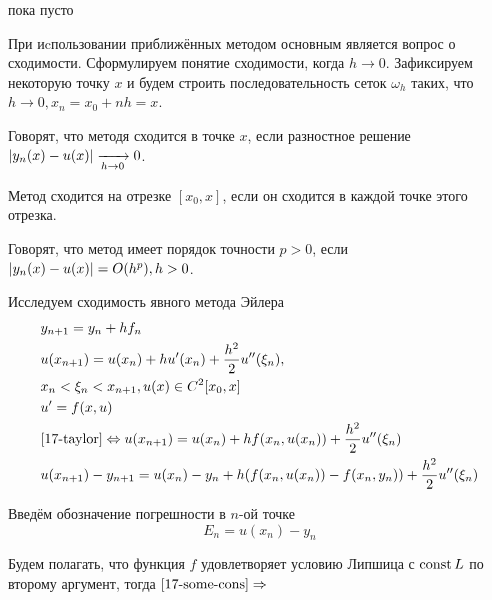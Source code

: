  \begin{col-answer-preambule}
	\begin{plan}
    \item пока пусто
	\end{plan}
\end{col-answer-preambule}


При иcпользовании приближённых методом основным является вопрос о сходимости.
Сформулируем понятие сходимости, когда $h \to 0$. Зафиксируем некоторую точку
$x$ и будем строить последовательность сеток $\omega_h$ таких, что $h \to 0,
x_n = x_0 + nh = x$.

\begin{definition}
  Говорят, что методя сходится в точке $x$, если разностное решение
  $\left\lvert y_n(x) - u(x) \right\rvert \xrightarrow[h \to 0]{} 0$.
\end{definition}

\begin{definition}
  Метод сходится на отрезке $[x_0, x]$, если он сходится в каждой точке этого
  отрезка.
\end{definition}

\begin{definition}
  Говорят, что метод имеет порядок точности $p > 0$, если $\left\lvert y_n(x) - u(x) \right\rvert
  = O(h^p), h > 0$.
\end{definition}

Исследуем сходимость явного метода Эйлера
\begin{align}
  &y_{n + 1} = y_n + hf_n\\
  \label{17-taylor}
  &u(x_{n + 1}) = u(x_n) + hu'(x_n) + \dfrac{h^2}{2}u''(\xi_n),\\
  \nonumber
  &x_n < \xi_n < x_{n + 1}, u(x) \in C^2[x_0, x]\\
  &u' = f(x, u)\\
  &\eqref{17-taylor} \Leftrightarrow u(x_{n + 1}) = u(x_n) + hf(x_n, u(x_n)) +
  \dfrac{h^2}{2}u''(\xi_n)\\
  \label{17-some-cons}
  &u(x_{n + 1}) - y_{n + 1} = u(x_n) - y_n + h(f(x_n, u(x_n)) - f(x_n, y_n)) +
  \dfrac{h^2}{2}u''(\xi_n)
\end{align}

Введём обозначение погрешности в $n$-ой точке
\begin{equation}
  E_n = u(x_n) - y_n
\end{equation}

Будем полагать, что функция $f$ удовлетворяет условию Липшица с $\operatorname{\text{const}} L$ по
второму аргумент, тогда $\eqref{17-some-cons} \Rightarrow$

